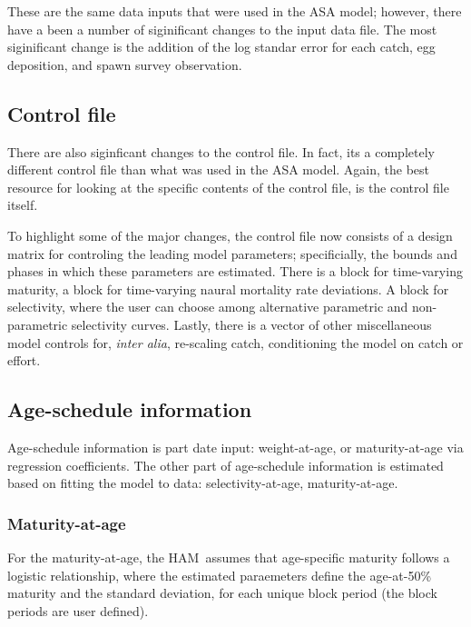 \documentclass[12pt,letterpaper]{article}
\newcommand{\ham}{HAM}
\begin{document}
    These are the same data inputs that were used in the ASA model; however, there have a been a number of siginificant changes to the input data file.  The most siginificant change is the addition of the log standar error for each catch, egg deposition, and spawn survey observation.  

  \subsection{Control file} %
  \label{sub:control_file}
    There are also siginficant changes to the control file.  In fact, its a completely different control file than what was used in the ASA model.  Again, the best resource for looking at the specific contents of the control file, is the control file itself. 

    To highlight some of the major changes, the control file now consists of a design matrix for controling the leading model parameters; specificially, the bounds and phases in which these parameters are estimated.  There is a block for time-varying maturity, a block for time-varying naural mortality rate deviations.  A block for selectivity, where the user can choose among alternative parametric and non-parametric selectivity curves. Lastly, there is a vector of other miscellaneous model controls for, \textit{inter alia}, re-scaling catch, conditioning the model on catch or effort.  


  \subsection{Age-schedule information} %
  \label{sub:age_schedule_information}
    Age-schedule information is part date input: weight-at-age, or maturity-at-age via regression coefficients. The other part of age-schedule information is estimated based on fitting the model to data: selectivity-at-age, maturity-at-age.  

    \subsubsection{Maturity-at-age} %
    \label{ssub:maturity_at_age}
      For the maturity-at-age, the \ham\ assumes that age-specific maturity follows a logistic relationship, where the estimated paraemeters define the age-at-50\% maturity and the standard deviation, for each unique block period (the block periods are user defined). 
\end{document}
